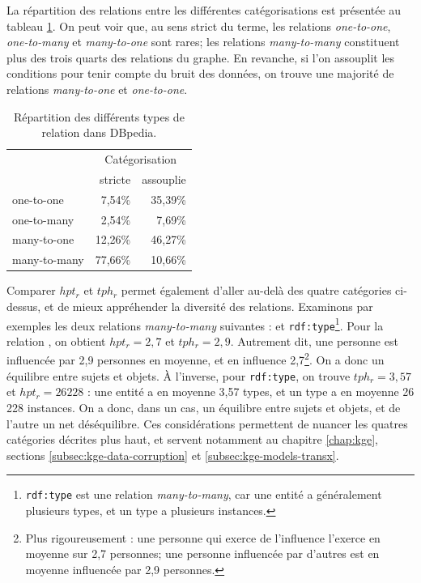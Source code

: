 La répartition des relations entre les différentes catégorisations est présentée au tableau \ref{tab:litt-rel-cardinalities}. On peut voir que, au sens strict du terme, les relations \textit{one-to-one}, \textit{one-to-many} et \textit{many-to-one} sont rares; les relations \textit{many-to-many} constituent plus des trois quarts des relations du graphe. En revanche, si l'on assouplit les conditions pour tenir compte du bruit des données, on trouve une majorité de relations \textit{many-to-one} et \textit{one-to-one}. 


\begin{table}[ht]
    \centering
    \caption{Répartition des différents types de relation dans DBpedia.}
    \begin{tabular}{|l|rr|}
    \hline
& \multicolumn{2}{c|}{Catégorisation} \\
& stricte & assouplie \\ \hline
one-to-one & 7,54\% & 35,39\% \\
one-to-many & 2,54\% & 7,69\% \\
many-to-one & 12,26\% & 46,27\% \\
many-to-many & 77,66\% & 10,66\% \\
\hline
    \end{tabular}
    \label{tab:litt-rel-cardinalities}
\end{table}

Comparer $hpt_r$ et $tph_r$ permet également d'aller au-delà des quatre catégories ci-dessus, et de mieux appréhender la diversité des relations. 
Examinons par exemples les deux relations \textit{many-to-many}  suivantes :  et \texttt{rdf:type}\footnote{\texttt{rdf:type} est une relation \textit{many-to-many}, car une entité a généralement plusieurs types, et un type a plusieurs instances.}.
Pour la relation , on obtient $hpt_r = 2,7$ et $tph_r=2,9$. Autrement dit, une personne est influencée par 2,9 personnes en moyenne, et en influence 2,7\footnote{Plus rigoureusement : une personne qui exerce de l'influence l'exerce en moyenne sur 2,7 personnes; une personne influencée par d'autres est en moyenne influencée par 2,9 personnes.}. On a donc un équilibre entre sujets et objets.
À l'inverse, pour \texttt{rdf:type}, on trouve $tph_r = 3,57$ et $hpt_r = 26 228$ : une entité a en moyenne 3,57 types, et un type a en moyenne 26 228 instances.  
On a donc, dans un cas, un équilibre entre sujets et objets, et de l'autre un net déséquilibre. 
Ces considérations permettent de nuancer les quatres catégories décrites plus haut, et servent notamment au chapitre \ref{chap:kge}, sections \ref{subsec:kge-data-corruption} et \ref{subsec:kge-models-transx}.

